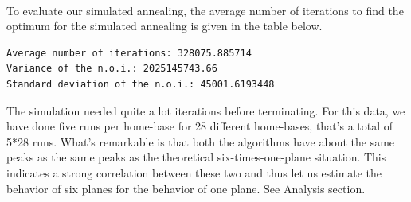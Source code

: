 \documentclass[journal]{IEEEtran}
\begin{document}
\\
To evaluate our simulated annealing, the average number of iterations to find the optimum for the simulated annealing is given in the table below. 
\begin{lstlisting}
Average number of iterations: 328075.885714
Variance of the n.o.i.: 2025145743.66
Standard deviation of the n.o.i.: 45001.6193448
\end{lstlisting}
The simulation needed quite a lot iterations before terminating. For this data, we have done five runs per home-base for 28 different home-bases, that's a total of 5*28 runs. What's remarkable is that both the algorithms have about the same peaks as the same peaks as the theoretical six-times-one-plane situation.  This indicates a strong correlation between these two and thus let us estimate the behavior of six planes for the behavior of one plane. See Analysis section. 
\\
\end{document}

